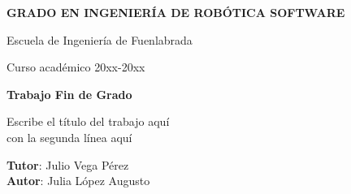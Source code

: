\thispagestyle{empty}
\vspace{2cm}

\begin{figure}[htb]
  \centerline{}
\end{figure}

\begin{center}
  {\Large {\bf GRADO EN INGENIERÍA DE ROBÓTICA SOFTWARE}}
  \vspace{5mm}
 
  {\large {Escuela de Ingeniería de Fuenlabrada}}
  \vspace{5mm}

  {\large {Curso académico 20xx-20xx}}

  \vspace{1cm}

  {\large {\bf Trabajo Fin de Grado}}

  \vspace{2cm}

  {\Large {Escribe el título del trabajo aquí\\
               con la segunda línea aquí\\[1cm] }}

  \vspace{5cm}
  {\bf Tutor}: Julio Vega Pérez \\
  {\bf Autor}: Julia López Augusto
\end{center}

\clearpage
\thispagestyle{empty}
